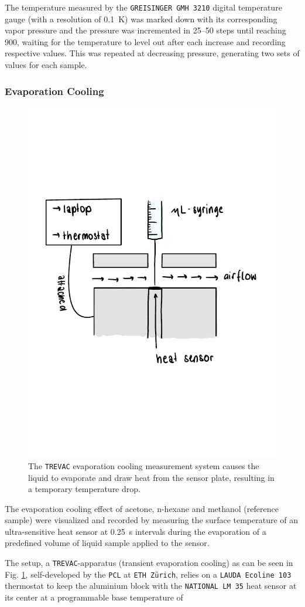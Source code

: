 The temperature measured by the \texttt{GREISINGER GMH 3210} digital temperature gauge (with a resolution of \qty{0.1}{\kelvin}) was marked down with its corresponding vapor pressure and the pressure was incremented in \qtyrange{25}{50}{\mbar} steps until reaching \qty{900}{\mbar}, waiting for the temperature to level out after each increase and recording respective values. This was repeated at decreasing pressure, generating two sets of values for each sample.


\subsubsection{Evaporation Cooling}

\begin{figure}[H]
    \centering
    \includegraphics[width=.5\textwidth]{figures/ddr_sketch_TREVAC.pdf}
    \caption{The \texttt{TREVAC} evaporation cooling measurement system causes the liquid to evaporate and draw heat from the sensor plate, resulting in a temporary temperature drop.}
    \label{fig:sketch_trevac}
\end{figure}


The evaporation cooling effect of acetone, n-hexane and methanol (reference sample) were visualized and recorded by measuring the surface temperature of an ultra-sensitive heat sensor at \qty{0.25}{\second} intervals during the evaporation of a predefined volume of liquid sample applied to the sensor.

The setup, a \texttt{TREVAC}-apparatus (transient evaporation cooling) as can be seen in Fig. \ref{fig:sketch_trevac}, self-developed by the \texttt{PCL} at \texttt{ETH Zürich}, relies on a \texttt{LAUDA Ecoline 103} thermostat to keep the aluminium block with the \texttt{NATIONAL LM 35} heat sensor at its center at a programmable base temperature of 

